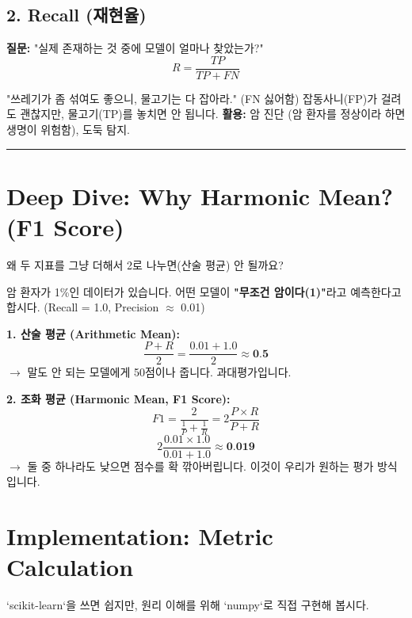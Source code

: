 \documentclass[11pt,a4paper]{book}
\theoremstyle{definition}
\begin{document}
\subsection{2. Recall (재현율)}

\textbf{질문:} "실제 존재하는 것 중에 모델이 얼마나 찾았는가?"
$$ R = \frac{TP}{TP + FN} $$
\begin{analogybox}[title={그물망 어선}]
"쓰레기가 좀 섞여도 좋으니, 물고기는 다 잡아라." (FN 싫어함)
잡동사니(FP)가 걸려도 괜찮지만, 물고기(TP)를 놓치면 안 됩니다.
\textbf{활용:} 암 진단 (암 환자를 정상이라 하면 생명이 위험함), 도둑 탐지.
\end{analogybox}

\vspace{0.5cm}\hrule\vspace{0.5cm}

\section{Deep Dive: Why Harmonic Mean? (F1 Score)}

왜 두 지표를 그냥 더해서 2로 나누면(산술 평균) 안 될까요?

\begin{mathbox}[title={바보 모델의 함정}]
암 환자가 1\%인 데이터가 있습니다.
어떤 모델이 \textbf{"무조건 암이다(1)"}라고 예측한다고 합시다. (Recall = 1.0, Precision $\approx$ 0.01)

\textbf{1. 산술 평균 (Arithmetic Mean):}
$$ \frac{P + R}{2} = \frac{0.01 + 1.0}{2} \approx \textbf{0.5} $$
$\rightarrow$ 말도 안 되는 모델에게 50점이나 줍니다. 과대평가입니다.

\textbf{2. 조화 평균 (Harmonic Mean, F1 Score):}
$$ F1 = \frac{2}{\frac{1}{P} + \frac{1}{R}} = 2 \frac{P \times R}{P + R} $$
$$ 2 \frac{0.01 \times 1.0}{0.01 + 1.0} \approx \textbf{0.019} $$
$\rightarrow$ 둘 중 하나라도 낮으면 점수를 확 깎아버립니다. 이것이 우리가 원하는 평가 방식입니다.
\end{mathbox}

\section{Implementation: Metric Calculation}

`scikit-learn`을 쓰면 쉽지만, 원리 이해를 위해 `numpy`로 직접 구현해 봅시다.
\end{document}
